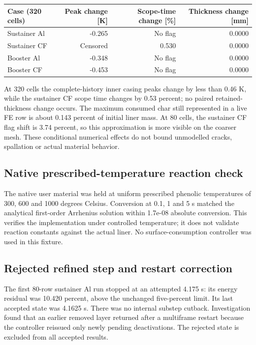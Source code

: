 \documentclass[oneside,openany]{amsdtx}
\begin{document}
\begin{table}[H]\centering\scriptsize\begin{tabular}{lrrr}\toprule Case (320 cells) & Peak change [K] & Scope-time change [\%] & Thickness change [mm]\\\midrule

Sustainer Al & -0.265 & No flag & 0.0000 \\
Sustainer CF & Censored & 0.530 & 0.0000 \\
Booster Al & -0.348 & No flag & 0.0000 \\
Booster CF & -0.453 & No flag & 0.0000 \\

\bottomrule\end{tabular}\end{table}

At 320 cells the complete-history inner casing peaks change by less than 0.46 K, while the sustainer CF scope time changes by 0.53 percent; no paired retained-thickness change occurs. The maximum consumed char still represented in a live FE row is about 0.143 percent of initial liner mass. At 80 cells, the sustainer CF flag shift is 3.74 percent, so this approximation is more visible on the coarser mesh. These conditional numerical effects do not bound unmodelled cracks, spallation or actual material behavior.

\subsection{Native prescribed-temperature reaction check}

The native user material was held at uniform prescribed phenolic temperatures of 300, 600 and 1000 degrees Celsius. Conversion at 0.1, 1 and 5 s matched the analytical first-order Arrhenius solution within 1.7e-08 absolute conversion. This verifies the implementation under controlled temperature; it does not validate reaction constants against the actual liner. No surface-consumption controller was used in this fixture.

\subsection{Rejected refined step and restart correction}

The first 80-row sustainer Al run stopped at an attempted 4.175 s: its energy residual was 10.420 percent, above the unchanged five-percent limit. Its last accepted state was 4.1625 s. There was no internal substep cutback. Investigation found that an earlier removed layer returned after a multiframe restart because the controller reissued only newly pending deactivations. The rejected state is excluded from all accepted results.
\end{document}
